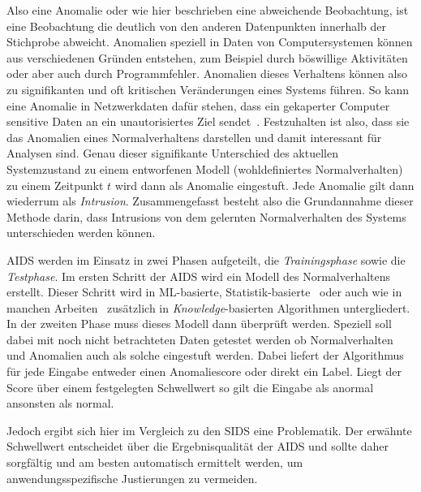                 Also eine Anomalie oder wie hier beschrieben eine abweichende Beobachtung, ist eine Beobachtung die deutlich von den anderen Datenpunkten innerhalb der Stichprobe abweicht.
                Anomalien speziell in Daten von Computersystemen können aus verschiedenen Gründen entstehen, zum Beispiel durch böswillige Aktivitäten oder aber auch durch Programmfehler.
                Anomalien dieses Verhaltens können also zu signifikanten und oft kritischen Veränderungen eines Systems führen.
                So kann eine Anomalie in Netzwerkdaten dafür stehen, dass ein gekaperter Computer sensitive Daten an ein unautorisiertes Ziel sendet~\cite{ANOMALYEXAMPLE}.
                Festzuhalten ist also, dass sie das Anomalien eines  Normalverhaltens darstellen und damit interessant für Analysen sind.
                Genau dieser signifikante Unterschied des aktuellen Systemzustand zu einem entworfenen Modell (wohldefiniertes Normalverhalten) zu einem Zeitpunkt $t$ wird dann als Anomalie eingestuft.
                Jede Anomalie gilt dann wiederrum als \textit{Intrusion}.
                Zusammengefasst besteht also die Grundannahme dieser Methode darin, dass Intrusions von dem gelernten Normalverhalten des Systems unterschieden werden können.


                \ac{AIDS} werden im Einsatz in zwei Phasen aufgeteilt, die \textit{Trainingsphase} sowie die \textit{Testphase}.
                Im ersten Schritt der \ac{AIDS} wird ein Modell des Normalverhaltens erstellt.
                Dieser Schritt wird in \ac{ML}-basierte, Statistik-basierte~\cite{IDSPIETRO2008} oder auch 
                wie in manchen Arbeiten~\cite{IDSsurvey} zusätzlich in \textit{Knowledge}-basierten  Algorithmen untergliedert.
                In der zweiten Phase muss dieses Modell dann überprüft werden.
                Speziell soll dabei mit noch nicht betrachteten Daten getestet werden ob Normalverhalten und Anomalien auch als solche eingestuft werden.
                Dabei liefert der Algorithmus für jede Eingabe entweder einen Anomaliescore oder direkt ein Label.
                Liegt der Score über einem festgelegten Schwellwert so gilt die Eingabe als anormal ansonsten als normal.~\cite{IDSPIETRO2008}

                Jedoch ergibt sich hier im Vergleich zu den \ac{SIDS} eine Problematik.
                Der erwähnte Schwellwert entscheidet über die Ergebnisqualität der \ac{AIDS} und sollte daher sorgfältig und am besten automatisch ermittelt werden, um anwendungsspezifische Justierungen zu vermeiden.


